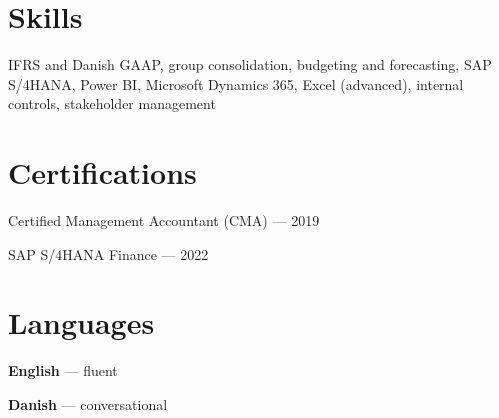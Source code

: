 \documentclass[a4paper,10pt]{article}
\begin{document}

\section{Skills}
IFRS and Danish GAAP, group consolidation, budgeting and forecasting, SAP S/4HANA, Power BI,
Microsoft Dynamics 365, Excel (advanced), internal controls, stakeholder management

\section{Certifications}
\begin{simplelist}
\item Certified Management Accountant (CMA) --- 2019
\item SAP S/4HANA Finance --- 2022
\end{simplelist}

\section{Languages}
\begin{simplelist}
\item \textbf{English} --- fluent
\item \textbf{Danish} --- conversational
\end{simplelist}
\end{document}
